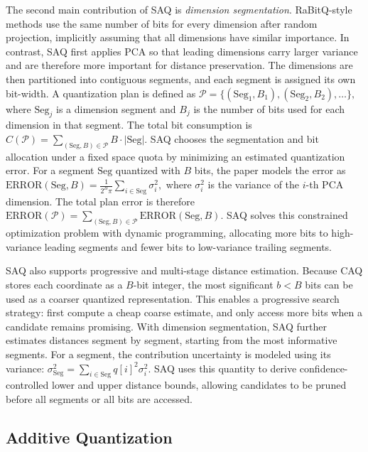 \documentclass[sigconf]{acmart}
\begin{document}
The second main contribution of SAQ is \emph{dimension segmentation}. 
RaBitQ-style methods use the same number of bits for every dimension after random projection, implicitly assuming that all dimensions have similar importance. 
In contrast, SAQ first applies PCA so that leading dimensions carry larger variance and are therefore more important for distance preservation. 
The dimensions are then partitioned into contiguous segments, and each segment is assigned its own bit-width. 
A quantization plan is defined as
\(
\mathcal{P}
=
\{(\mathrm{Seg}_1,B_1),(\mathrm{Seg}_2,B_2),\ldots\},
\)
where $\mathrm{Seg}_j$ is a dimension segment and $B_j$ is the number of bits used for each dimension in that segment. 
The total bit consumption is
\(
C(\mathcal{P})
=
\sum_{(\mathrm{Seg},B)\in\mathcal{P}}
B\cdot |\mathrm{Seg}|.
\)
SAQ chooses the segmentation and bit allocation under a fixed space quota by minimizing an estimated quantization error. 
For a segment $\mathrm{Seg}$ quantized with $B$ bits, the paper models the error as
\(
\mathrm{ERROR}(\mathrm{Seg},B)
=
\frac{1}{2^B\pi}
\sum_{i\in \mathrm{Seg}}\sigma_i^2,
\)
where $\sigma_i^2$ is the variance of the $i$-th PCA dimension. 
The total plan error is therefore
\(
\mathrm{ERROR}(\mathcal{P})
=
\sum_{(\mathrm{Seg},B)\in\mathcal{P}}
\mathrm{ERROR}(\mathrm{Seg},B).
\)
SAQ solves this constrained optimization problem with dynamic programming, allocating more bits to high-variance leading segments and fewer bits to low-variance trailing segments.

SAQ also supports progressive and multi-stage distance estimation. 
Because CAQ stores each coordinate as a $B$-bit integer, the most significant $b<B$ bits can be used as a coarser quantized representation. 
This enables a progressive search strategy: first compute a cheap coarse estimate, and only access more bits when a candidate remains promising. 
With dimension segmentation, SAQ further estimates distances segment by segment, starting from the most informative segments. 
For a segment, the contribution uncertainty is modeled using its variance:
\(
\sigma_{\mathrm{Seg}}^2
=
\sum_{i\in \mathrm{Seg}} q[i]^2\sigma_i^2.
\)
SAQ uses this quantity to derive confidence-controlled lower and upper distance bounds, allowing candidates to be pruned before all segments or all bits are accessed.

\subsection{Additive Quantization}
\end{document}
